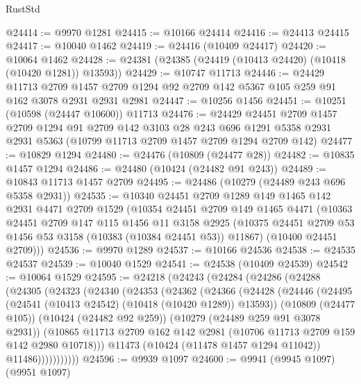 \begin{lexlean}{RustStd}
\begin{coremodule}
@24414 := @9970 @1281
@24415 := @10166 @24414
@24416 := @24413 @24415
@24417 := @10040 @1462
@24419 := @24416 (@10409 @24417)
@24420 := @10064 @1462
@24428 := @24381 (@24385 (@24419 (@10413 @24420) (@10418 (@10420 @1281)) @13593))
@24429 := @10747 @11713
@24446 := @24429
    @11713
    @2709
    @1457
    @2709
    @1294
    @92
    @2709
    @142
    @5367
    @105
    @259
    @91
    @162
    @3078
    @2931
    @2931
    @2981
@24447 := @10256 @1456
@24451 := @10251 (@10598 (@24447 @10600)) @11713
@24476 := @24429
    @24451
    @2709
    @1457
    @2709
    @1294
    @91
    @2709
    @142
    @3103
    @28
    @243
    @696
    @1291
    @5358
    @2931
    @2931
    @5363
    (@10799 @11713 @2709 @1457 @2709 @1294 @2709 @142)
@24477 := @10829 @1294
@24480 := @24476 (@10809 (@24477 @28))
@24482 := @10835 @1457 @1294
@24486 := @24480 (@10424 (@24482 @91 @243))
@24489 := @10843 @11713 @1457 @2709
@24495 := @24486 (@10279 (@24489 @243 @696 @5358 @2931))
@24535 := @10340
    @24451
    @2709
    @1289
    @149
    @1465
    @142
    @2931
    @4471
    @2709
    @1529
    (@10354
      @24451
      @2709
      @149
      @1465
      @4471
      (@10363
        @24451
        @2709
        @147
        @115
        @1456
        @11
        @3158
        @2925
        (@10375 @24451 @2709 @53 @1456 @53 @3158 (@10383 (@10384 @24451 @53)) @11867)
        (@10400 @24451 @2709)))
@24536 := @9970 @1289
@24537 := @10166 @24536
@24538 := @24535 @24537
@24539 := @10040 @1529
@24541 := @24538 (@10409 @24539)
@24542 := @10064 @1529
@24595 := @24218
    (@24243
      (@24284
        (@24286
          (@24288
            (@24305
              (@24323
                (@24340
                  (@24353
                    (@24362
                      (@24366
                        (@24428
                          (@24446
                            (@24495 (@24541 (@10413 @24542) (@10418 (@10420 @1289)) @13593))
                            (@10809 (@24477 @105))
                            (@10424 (@24482 @92 @259))
                            (@10279 (@24489 @259 @91 @3078 @2931))
                            (@10865
                              @11713
                              @2709
                              @162
                              @142
                              @2981
                              (@10706 @11713 @2709 @159 @142 @2980 @10718)))
                          @11473
                          (@10424 (@11478 @1457 @1294 @11042))
                          @11486)))))))))))
@24596 := @9939 @1097
@24600 := @9941 (@9945 @1097) (@9951 @1097)

\end{coremodule}
\end{lexlean}
